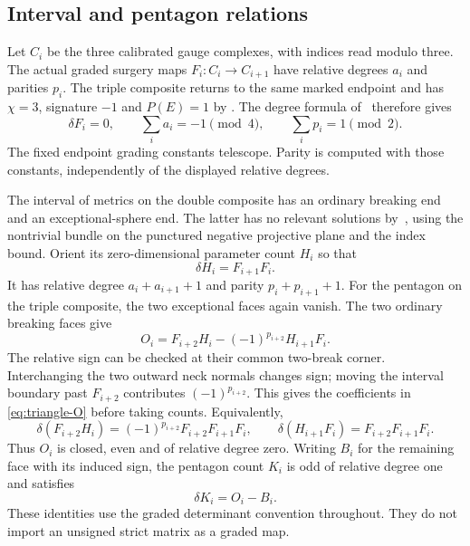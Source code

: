 \documentclass[11pt]{amsart}
\theoremstyle{definition}
\theoremstyle{remark}
\theoremstyle{plain}
\begin{document}
\subsection{Interval and pentagon relations}
Let $C_i$ be the three calibrated gauge complexes, with indices
read modulo three. The actual graded surgery maps $F_i:C_i\to C_{i+1}$
have relative degrees $a_i$ and parities $p_i$. The triple composite returns to the same marked endpoint and has
$\chi=3$, signature $-1$ and $P(E)=1$ by
\cite[Section~7.5]{Scaduto}. The degree formula
of~\cite[Proposition~7.1, (29)]{Scaduto} therefore gives
\begin{equation}\label{eq:triangle-degrees}
 \delta F_i=0,\qquad \sum_i a_i=-1\pmod4,\qquad
 \sum_i p_i=1\pmod2.
\end{equation}
The fixed endpoint grading constants telescope. Parity is computed
with those constants, independently of the displayed relative degrees.

The interval of metrics on the double composite has an ordinary
breaking end and an exceptional-sphere end. The latter has no
relevant solutions by~\cite[Section~5.2]{Scaduto}, using the
nontrivial bundle on the punctured negative projective plane and
the index bound. Orient its zero-dimensional parameter count $H_i$
so that
\begin{equation}\label{eq:triangle-interval}
 \delta H_i=F_{i+1}F_i.
\end{equation}
It has relative degree $a_i+a_{i+1}+1$ and parity $p_i+p_{i+1}+1$.
For the pentagon on the triple composite, the two exceptional
faces again vanish. The two ordinary breaking faces give
\begin{equation}\label{eq:triangle-O}
 O_i=F_{i+2}H_i-(-1)^{p_{i+2}}H_{i+1}F_i.
\end{equation}
The relative sign can be checked at their common two-break
corner. Interchanging the two outward neck normals changes sign;
moving the interval boundary past $F_{i+2}$ contributes
$(-1)^{p_{i+2}}$. This gives the coefficients in
\eqref{eq:triangle-O} before taking counts. Equivalently,
\[
 \delta(F_{i+2}H_i)=(-1)^{p_{i+2}}F_{i+2}F_{i+1}F_i,
 \qquad
 \delta(H_{i+1}F_i)=F_{i+2}F_{i+1}F_i.
\]
Thus $O_i$ is closed, even and of relative degree zero.
Writing $B_i$ for the remaining face with its induced sign, the
pentagon count $K_i$ is odd of relative degree one and satisfies
\begin{equation}\label{eq:pentagon-boundary}
 \delta K_i=O_i-B_i.
\end{equation}
These identities use the graded determinant convention throughout.
They do not import an unsigned strict matrix as a graded map.
\end{document}
